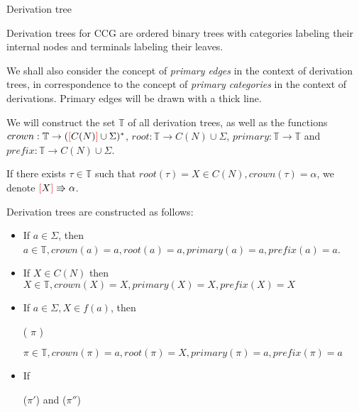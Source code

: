 \documentclass[main.tex]{subfiles}
\begin{document}
\begin{defn}
    Derivation tree

    Derivation trees for CCG are ordered binary trees with categories labeling
    their internal nodes and terminals labeling their leaves.

    We shall also consider the concept of \emph{primary edges} in the context
    of derivation trees, in correspondence to the concept of
    \emph{primary categories} in the context of derivations. Primary edges
    will be drawn with a thick line.

    We will construct the set $ \mathbb{T} $ of all derivation trees, as well
    as the functions $ crown: \mathbb{T} \rightarrow ( \textcolor{red}{[} C(N) \textcolor{red}{]} \cup \Sigma )^* $,
    $ root: \mathbb{T} \rightarrow C(N) \cup \Sigma$,
    $ primary : \mathbb{T} \rightarrow \mathbb{T} $ and
    $ prefix : \mathbb{T} \rightarrow C(N) \cup \Sigma $.

    If there exists $\tau \in \mathbb{T}$ such that $root(\tau) = X \in C(N),
    crown(\tau) = \alpha$, we denote $\textcolor{red}{[} X \textcolor{red}{]} \Rrightarrow \alpha$.

    Derivation trees are constructed as follows:

    \begin{itemize}
        \item If $ a \in \Sigma $, then
            $ a \in \mathbb{T}, crown(a) = a, root(a) = a, primary(a) = a, prefix(a) = a$.
        \item If $ X \in C(N) $ then $ X \in \mathbb{T}, crown(X) = X, primary(X) = X, prefix(X) = X$
        \item If $ a \in \Sigma, X \in f(a) $, then
            \begin{center}
                 ( $ \pi $ )
            \end{center}
            $ \pi \in \mathbb{T}, crown(\pi) = a, root(\pi) = X, primary(\pi) = a, prefix(\pi) = a $
        \item If
            \begin{center}
                 ($\pi'$)
                \quad and \quad
                 ($\pi''$)
            \end{center}


\end{itemize}
\end{defn}
\end{document}
